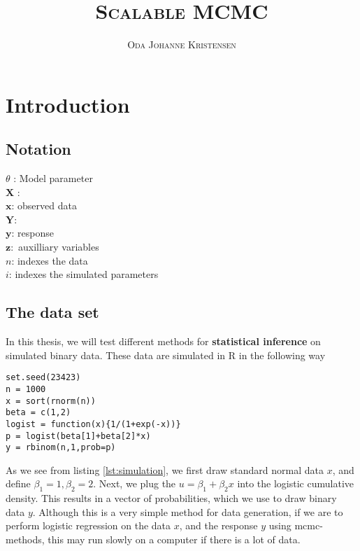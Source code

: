 \documentclass{article}
\title{\textsc{Scalable MCMC}}
\author{\textsc{Oda Johanne Kristensen}}
\date{}
\theoremstyle{definition}
\begin{document}
\maketitle
\section{Introduction}
\subsection{Notation}
$\theta$ : Model parameter \\
$\mathbf{X}$ : \\
$\mathbf{x}$: observed data \\
$\mathbf{Y}$: \\
$\mathbf{y}$: response \\
$\mathbf{z}:$ auxilliary variables \\ 
$n$: indexes the data \\ 
$i$: indexes the simulated parameters 
\subsection{The data set}\label{subsec:data}
In this thesis, we will test different methods for \textbf{statistical inference} on simulated binary data. These data are simulated in R in the following way
\begin{lstlisting}[caption={simulation of binary data}, label={lst:simulation}]
set.seed(23423)
n = 1000
x = sort(rnorm(n))
beta = c(1,2)
logist = function(x){1/(1+exp(-x))}
p = logist(beta[1]+beta[2]*x)
y = rbinom(n,1,prob=p)
\end{lstlisting}
As we see from listing \ref{lst:simulation}, we first draw standard normal data $x$, and define $\beta_1 = 1, \beta_2 = 2$. Next, we plug the  $u = \beta_1 + \beta_2 x$ into the logistic cumulative density. This results in a vector of probabilities, which we use to draw binary data $y$. Although this is a very simple method for data generation, if we are to perform logistic regression on the data $x$, and the response $y$ using \gls{mcmc}-methods, this may run slowly on a computer if there is a lot of data.
\end{document}
